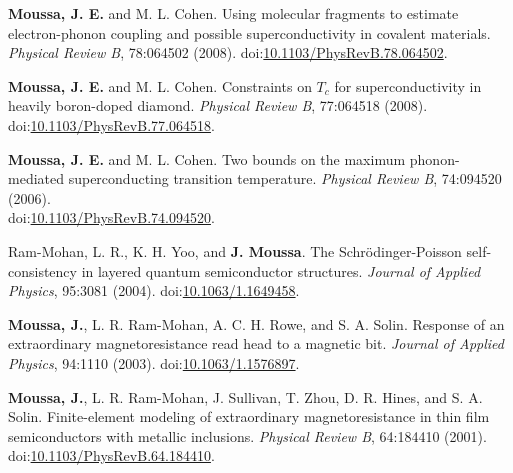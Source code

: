 \documentclass[10pt]{article}
\makeatletter
\newlength{\bibhang}
\newlength{\bibsep}
 {\@listi \global\bibsep\itemsep \global\advance\bibsep by\parsep}
\newenvironment{bibsection}%
        {\vspace{-1.6\baselineskip}\begin{etaremune}[leftmargin=1.6em]{%
       \setlength{\leftmargin}{\bibhang}%
       \setlength{\itemindent}{-\leftmargin}%
       \setlength{\itemsep}{\bibsep}%
       \setlength{\parsep}{\z@}%
        \setlength{\partopsep}{0pt}%
        \setlength{\topsep}{0pt}}}
        {\end{etaremune}\vspace{-.6\baselineskip}}
\newcommand\doilink[1]{\href{http://dx.doi.org/#1}{#1}}
\newcommand\doi[1]{doi:\doilink{#1}}
\makeatother
\begin{document}
\begin{bibsection}
    \item \textbf{Moussa, J. E.} and M. L. Cohen.
         Using molecular fragments to estimate electron-phonon coupling and possible superconductivity in covalent materials.
         \emph{Physical Review B}, 78:064502 (2008). \doi{10.1103/PhysRevB.78.064502}.

    \item \textbf{Moussa, J. E.} and M. L. Cohen.
         Constraints on $T_c$ for superconductivity in heavily boron-doped diamond.
         \emph{Physical Review B}, 77:064518 (2008). \\ \doi{10.1103/PhysRevB.77.064518}.

    \item \textbf{Moussa, J. E.} and M. L. Cohen.
         Two bounds on the maximum phonon-mediated superconducting transition temperature.
         \emph{Physical Review B}, 74:094520 (2006). \\ \doi{10.1103/PhysRevB.74.094520}.

    \item Ram-Mohan, L. R., K. H. Yoo, and \textbf{J. Moussa}.
         The Schr\"odinger-Poisson self-consistency in layered quantum semiconductor structures.
         \emph{Journal of Applied Physics}, 95:3081 (2004). \doi{10.1063/1.1649458}.

    \item \textbf{Moussa, J.}, L. R. Ram-Mohan, A. C. H. Rowe, and S. A. Solin.
        Response of an extraordinary magnetoresistance read head to a magnetic bit.
        \emph{Journal of Applied Physics}, 94:1110 (2003). \doi{10.1063/1.1576897}.

    \item \textbf{Moussa, J.}, L. R. Ram-Mohan, J. Sullivan, T. Zhou, D. R. Hines, and S. A. Solin.
        Finite-element modeling of extraordinary magnetoresistance in thin film semiconductors with metallic inclusions.
        \emph{Physical Review B}, 64:184410 (2001). \doi{10.1103/PhysRevB.64.184410}.

\end{bibsection}
\end{document}
